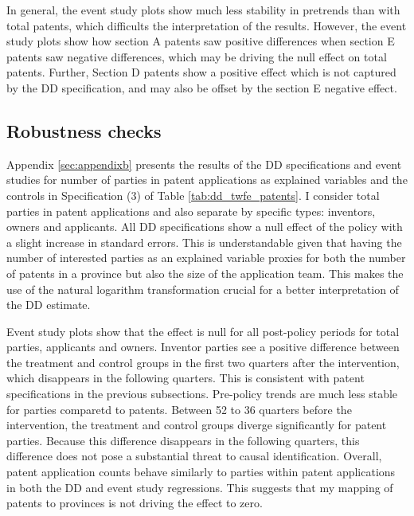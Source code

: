 \documentclass[../main.tex]{subfiles}
\begin{document}
In general, the event study plots show much less stability in pretrends than with total patents, which difficults the interpretation of the results. However, the event study plots show how section A patents saw positive differences when section E patents saw negative differences, which may be driving the null effect on total patents. Further, Section D patents show a positive effect which is not captured by the DD specification, and may also be offset by the section E negative effect.

\subsection{Robustness checks}

Appendix \ref{sec:appendixb} presents the results of the DD specifications and event studies for number of parties in patent applications as explained variables and the controls in Specification (3) of Table \ref{tab:dd_twfe_patents}. I consider total parties in patent applications and also separate by specific types: inventors, owners and applicants. All DD specifications show a null effect of the policy with a slight increase in standard errors. This is understandable given that having the number of interested parties as an explained variable proxies for both the number of patents in a province but also the size of the application team. This makes the use of the natural logarithm transformation crucial for a better interpretation of the DD estimate. 

Event study plots show that the effect is null for all post-policy periods for total parties, applicants and owners. Inventor parties see a positive difference between the treatment and control groups in the first two quarters after the intervention, which disappears in the following quarters. This is consistent with patent specifications in the previous subsections. Pre-policy trends are much less stable for parties comparetd to patents. Between 52 to 36 quarters before the intervention, the treatment and control groups diverge significantly for patent parties. Because this difference disappears in the following quarters, this difference does not pose a substantial threat to causal identification. Overall, patent application counts behave similarly to parties within patent applications in both the DD and event study regressions. This suggests that my mapping of patents to provinces is not driving the effect to zero.
\end{document}
